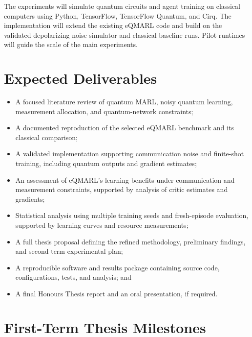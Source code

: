 \documentclass[12pt]{article}
\begin{document}
The experiments will simulate quantum circuits and agent training on classical computers using Python, TensorFlow, TensorFlow Quantum, and Cirq. The implementation will extend the existing eQMARL code and build on the validated depolarizing-noise simulator and classical baseline runs. Pilot runtimes will guide the scale of the main experiments.

\newpage
\section{Expected Deliverables}

\begin{itemize}
    \item A focused literature review of quantum MARL, noisy quantum learning, measurement allocation, and quantum-network constraints;
    \item A documented reproduction of the selected eQMARL benchmark and its classical comparison;
    \item A validated implementation supporting communication noise and finite-shot training, including quantum outputs and gradient estimates;
    \item An assessment of eQMARL's learning benefits under communication and measurement constraints, supported by analysis of critic estimates and gradients;
    \item Statistical analysis using multiple training seeds and fresh-episode evaluation, supported by learning curves and resource measurements;
    \item A full thesis proposal defining the refined methodology, preliminary findings, and second-term experimental plan;
    \item A reproducible software and results package containing source code, configurations, tests, and analysis; and
    \item A final Honours Thesis report and an oral presentation, if required.
\end{itemize}

\section{First-Term Thesis Milestones}
\end{document}
